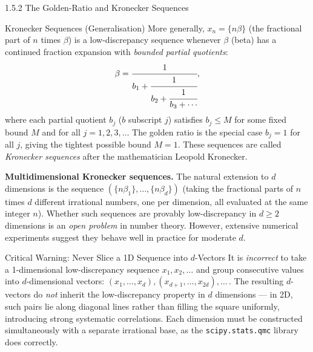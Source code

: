 \documentclass[aspectratio=169,10pt]{beamer}
\begin{document}
\begin{frame}[allowframebreaks]{1.5.2 The Golden-Ratio and Kronecker Sequences}
  \framebreak

  \begin{block}{Kronecker Sequences (Generalisation)}
    More generally, $x_n = \{n\beta\}$ (the fractional part of $n$ times
    $\beta$) is a low-discrepancy sequence whenever $\beta$ (beta) has a
    continued fraction expansion with \emph{bounded partial quotients}:
    \[
      \beta = \cfrac{1}{b_1 + \cfrac{1}{b_2 + \cfrac{1}{b_3 + \cdots}}},
    \]
    where each partial quotient $b_j$ ($b$ subscript $j$) satisfies $b_j \le M$
    for some fixed bound $M$ and for all $j = 1, 2, 3, \ldots$  The golden ratio
    is the special case $b_j = 1$ for all $j$, giving the tightest possible
    bound $M = 1$.  These sequences are called \emph{Kronecker sequences} after
    the mathematician Leopold Kronecker.
  \end{block}

  \textbf{Multidimensional Kronecker sequences.}  The natural extension to $d$
  dimensions is the sequence $(\{n\beta_1\}, \ldots, \{n\beta_d\})$ (taking the
  fractional parts of $n$ times $d$ different irrational numbers, one per
  dimension, all evaluated at the same integer $n$).  Whether such sequences
  are provably low-discrepancy in $d \ge 2$ dimensions is an \emph{open problem}
  in number theory.  However, extensive numerical experiments suggest they behave
  well in practice for moderate $d$.

  \begin{alertblock}{Critical Warning: Never Slice a 1D Sequence into $d$-Vectors}
    It is \emph{incorrect} to take a 1-dimensional low-discrepancy sequence
    $x_1, x_2, \ldots$ and group consecutive values into $d$-dimensional
    vectors: $(x_1, \ldots, x_d), (x_{d+1}, \ldots, x_{2d}), \ldots$\,.  The
    resulting $d$-vectors do \emph{not} inherit the low-discrepancy property in
    $d$ dimensions --- in 2D, such pairs lie along diagonal lines rather than
    filling the square uniformly, introducing strong systematic correlations.
    Each dimension must be constructed simultaneously with a separate irrational
    base, as the \texttt{scipy.stats.qmc} library does correctly.
  \end{alertblock}

\end{frame}
\end{document}
